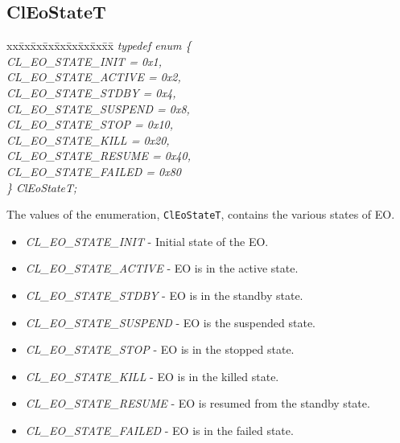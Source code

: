 \begin{flushleft}
\subsection{ClEoStateT}
\begin{tabbing}
xx\=xx\=xx\=xx\=xx\=xx\=xx\=xx\=xx\=\kill
\textit{typedef enum \{}\\
\>\>\>\textit{CL\_EO\_STATE\_INIT        = 0x1,}\\
\>\>\>\textit{CL\_EO\_STATE\_ACTIVE      = 0x2,}\\
\>\>\>\textit{CL\_EO\_STATE\_STDBY       = 0x4,}\\
\>\>\>\textit{CL\_EO\_STATE\_SUSPEND     = 0x8,}\\
\>\>\>\textit{CL\_EO\_STATE\_STOP        = 0x10,}\\
\>\>\>\textit{CL\_EO\_STATE\_KILL        = 0x20,}\\
\>\>\>\textit{CL\_EO\_STATE\_RESUME      = 0x40,}\\
\>\>\>\textit{CL\_EO\_STATE\_FAILED      = 0x80}\\
\textit{\} ClEoStateT;}\end{tabbing}
The values of the enumeration, {\tt{ClEoStateT}}, contains the various states of EO.
\begin{itemize}
 \item
 \textit{CL\_\-EO\_\-STATE\_\-INIT} - Initial state of the EO.
 \item
 \textit{CL\_\-EO\_\-STATE\_\-ACTIVE} - EO is in the active state.
 \item
 \textit{CL\_\-EO\_\-STATE\_\-STDBY} - EO is in the standby state.
 \item
 \textit{CL\_\-EO\_\-STATE\_\-SUSPEND} - EO is the suspended state.
 \item
 \textit{CL\_\-EO\_\-STATE\_\-STOP} - EO is in the stopped state.
 \item
 \textit{CL\_\-EO\_\-STATE\_\-KILL} - EO is in the killed state.
 \item
 \textit{CL\_\-EO\_\-STATE\_\-RESUME} - EO is resumed from the standby state.
 \item
 \textit{CL\_\-EO\_\-STATE\_\-FAILED} - EO is in the failed state.
\end{itemize}
 
 


\end{flushleft}

